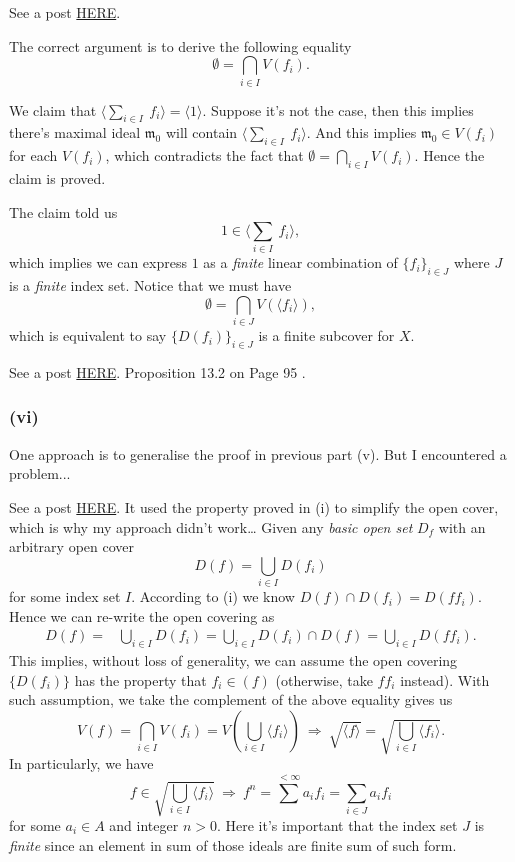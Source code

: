 See a post \href{https://math.stackexchange.com/questions/104248/compactness-of-operatornamespeca}{HERE}. 

The correct argument is to derive the following equality
$$\emptyset = \bigcap_{i\in I} V(f_i).$$

We claim that $\langle \sum_{i\in I}~ f_i\rangle= \langle 1\rangle$. Suppose it's not the case, then this implies there's maximal ideal $\mathfrak m_0$ will contain $\langle \sum_{i\in I}~ f_i\rangle$. And this implies $\mathfrak m_0\in V(f_i)$ for each $V(f_i)$, which contradicts the fact that $\emptyset = \bigcap_{i\in I} V(f_i)$. Hence the claim is proved. 

The claim told us $$1\in \langle \sum_{i\in I}~ f_i\rangle,$$ which implies we can express $1$ as a \textit{finite} linear combination of $\{f_i\}_{i\in J}$ where $J$ is a \textit{finite} index set. Notice that we must have $$\emptyset=\bigcap_{i\in J}V(\langle f_i\rangle),$$ which is equivalent to say $\{D(f_i)\}_{i\in J}$ is a finite subcover for $X$.

See a post \href{https://math.stackexchange.com/questions/2319058/proof-verification-zariski-topology-is-quasi-compact}{HERE}. Proposition 13.2 on Page 95 \cite{altman}. 

\subsubsection{(vi)}
One approach is to generalise the proof in previous part (v). But I encountered a problem...

See a post \href{https://math.stackexchange.com/questions/1175478/basic-open-sets-in-the-zariski-topology-are-also-compact}{HERE}. 
It used the property proved in (i) to simplify the open cover, which is why my approach didn't work\dots 
Given any \textit{basic open set} $D_f$ with an arbitrary open cover 
$$D(f)=\bigcup_{i\in I} D(f_i)$$ for some index set $I$. According to (i) we know $D(f)\cap D(f_i)=D(ff_i)$. Hence we can re-write the open covering as \begin{align*}
    D(f) =& \bigcup_{i\in I} D(f_i)
        = \bigcup_{i\in I} D(f_i)\cap D(f)
        = \bigcup_{i\in I} D(ff_i).
\end{align*}
This implies, without loss of generality, we can assume the open covering $\{D(f_i)\}$ has the property that $f_i\in (f)$ (otherwise, take $ff_i$ instead). With such assumption, we take the complement of the above equality gives us 
$$V(f)=\bigcap_{i\in I} V(f_i)=V(\bigcup_{i\in I}\langle f_i\rangle) ~\Rightarrow~ \sqrt{\langle f\rangle}=\sqrt{\bigcup_{i\in I}\langle f_i\rangle}.$$
In particularly, we have $$f\in \sqrt{\bigcup_{i\in I}\langle f_i\rangle} ~\Rightarrow~ f^n=\sum^{<\infty} a_if_i=\sum_{i\in J}a_if_i$$ for some $a_i\in A$ and integer $n>0$. Here it's important that the index set $J$ is \textit{finite} since an element in sum of those ideals are finite sum of such form. 

